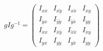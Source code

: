 \begin{equation}
\label{eq:Jp}
  g I g^{-1} = 
  \begin{pmatrix}
    I_{xx} & I_{x\check{y}} & I_{x\check{x}} & I_{xy} \\
    I_{\check{y}x} & I_{\check{y}\check{y}} 
      & I_{\check{y}\check{x}} & I_{\check{y}y} \\
    I_{\check{x}x} & I_{\check{x}\check{y}} 
      & I_{\check{x}\check{x}} & I_{\check{x}y} \\
    I_{yx} & I_{y\check{y}} & I_{y\check{x}} & I_{yy}
  \end{pmatrix}
\end{equation}

